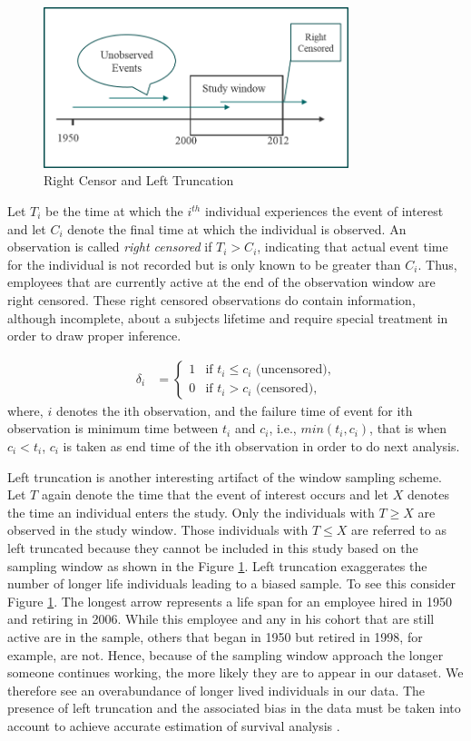 \documentclass[12pt,letterpaper]{article}
\begin{document}
 \begin{figure}[htbp]
 	\centering
 	\includegraphics[width=3.5in]{fig1.png}
 	\caption{Right Censor and Left Truncation}
 	\label{fig:1}
 \end{figure}
  Let $T_i$ be the time at which the $i^{th}$ individual experiences the event of interest and let $C_i$ denote the final time at which the individual is observed. An observation is called {\it right censored} if $T_i> C_i$, indicating that actual event time for the individual  is not recorded but is only known to be greater than $C_i$. Thus, employees that are currently active at the end of the observation window are right censored. These right censored observations do contain information, although incomplete, about a subjects lifetime and require special treatment in order to draw proper inference.

 \begin{align*}
 	\delta_i&=
 	\begin{cases}
 		1   &\text{if  }  t_i \leq c_i \text{ (uncensored),}\\
 		0   &\text{if  }  t_i > c_i \text{ (censored),}
 	\end{cases}
 \end{align*}
 where, $i$ denotes the ith observation, and the failure time of event for ith observation is minimum time between $t_i$ and $c_i$, i.e., $min(t_i, c_i)$, that is when $ c_i <t_i $, $c_i$ is taken as end time of the ith observation in order to do next  analysis.

 Left truncation is another interesting artifact of the window sampling scheme. Let $T$ again denote the time that the event of interest occurs and let $X$ denotes the time an individual enters the study. Only the individuals with $T \geq X$ are observed in the study window.  Those individuals with $T \leq X$ are referred to as left truncated because they cannot be included in this study based on the sampling window as shown in the Figure \ref{fig:1}. Left truncation exaggerates the number of longer life individuals leading to a biased sample. To see this consider Figure \ref{fig:1}. The longest arrow represents a life span for an employee hired in 1950 and retiring in 2006. While this employee and any in his cohort that are still active are in the sample, others that began in 1950 but retired in 1998, for example, are not. Hence, because of the sampling window approach the longer someone continues working, the more likely they are to appear in our dataset.  We therefore see an overabundance of longer lived individuals in our data.  The presence of left truncation and the associated bias in the data must be taken into account to achieve accurate estimation of survival analysis \citep{carrion2010}.
\end{document}
